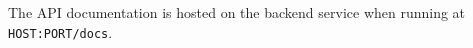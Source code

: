 \label{apidocs}
The API documentation is hosted on the backend service when running at \texttt{HOST:PORT/docs}.

